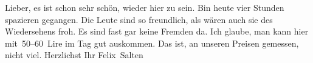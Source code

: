            \vspace{1em}
\pstart
           \noindent{}{\pb}Lieber, es ist schon sehr schön, wieder hier zu sein. Bin heute vier Stunden spazieren gegangen. Die Leute sind so freundlich, als
               wären auch sie des Wiedersehens froh. Es sind fast gar keine Fremden da. Ich glaube,
               man kann hier mit 50–60 Lire im Tag gut auskommen. Das ist, an unseren Preisen
               gemessen, nicht viel.\pend
           \pstart Herzlichst Ihr \spacefill\mbox{Felix Salten}\pend{}\endnumbering{}  \newcommand{\dateiname}{L03576}\newcommand{\titel}{Felix Salten an Arthur Schnitzler, [28. oder 29]. 3. 1922}\newcommand{\editorInnen}{Martin Anton Müller und Laura Untner}
